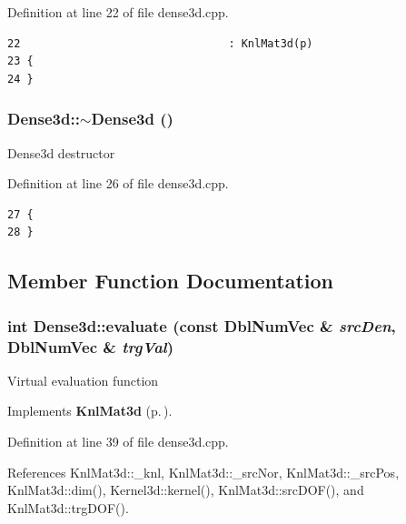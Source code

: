 Definition at line 22 of file dense3d.cpp.

\footnotesize\begin{verbatim}22                                : KnlMat3d(p)
23 {
24 }
\end{verbatim}\normalsize 


\subsubsection{\setlength{\rightskip}{0pt plus 5cm}Dense3d::$\sim$Dense3d ()}\label{classDense3d_465b01ffd81006def662ecab05e22099_465b01ffd81006def662ecab05e22099}


Dense3d destructor 

Definition at line 26 of file dense3d.cpp.

\footnotesize\begin{verbatim}27 {
28 }
\end{verbatim}\normalsize 




\subsection{Member Function Documentation}
\subsubsection{\setlength{\rightskip}{0pt plus 5cm}int Dense3d::evaluate (const Dbl\-Num\-Vec \& {\em src\-Den}, Dbl\-Num\-Vec \& {\em trg\-Val})\hspace{0.3cm}{\tt  [virtual]}}\label{classDense3d_3d2ce8cfb3d9632d6b69352f1bb5eda2_3d2ce8cfb3d9632d6b69352f1bb5eda2}


Virtual evaluation function 

Implements {\bf Knl\-Mat3d} {\rm (p.\,\pageref{classKnlMat3d_fcf3de1e6ce4ee024ef0d320363bd920_fcf3de1e6ce4ee024ef0d320363bd920})}.

Definition at line 39 of file dense3d.cpp.

References Knl\-Mat3d::\_\-knl, Knl\-Mat3d::\_\-src\-Nor, Knl\-Mat3d::\_\-src\-Pos, Knl\-Mat3d::dim(), Kernel3d::kernel(), Knl\-Mat3d::src\-DOF(), and Knl\-Mat3d::trg\-DOF().

